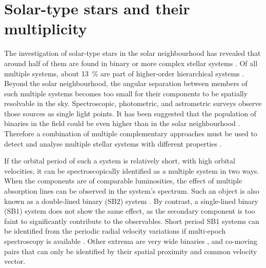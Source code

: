 \section{Solar-type stars and their multiplicity}
\label{sec:multiplicity_intro_twins}
The investigation of solar-type stars in the solar neighbourhood has revealed that around half of them are found in binary or more complex stellar systems \cite{2010ApJS..190....1R, 2013ARA&A..51..269D, 2017ApJS..230...15M}. Of all multiple systems, about 13~\% are part of higher-order hierarchical systems \cite{2010ApJS..190....1R, 2014AJ....147...87T}. Beyond the solar neighbourhood, the angular separation between members of such multiple systems becomes too small for their components to be spatially resolvable in the sky. Spectroscopic, photometric, and astrometric surveys observe those sources as single light points. It has been suggested that the population of binaries in the field could be even higher than in the solar neighbourhood \cite{2000A&A...361..770Q}. Therefore a combination of multiple complementary approaches must be used to detect and analyse multiple stellar systems with different properties \cite{2017ApJS..230...15M}.

If the orbital period of such a system is relatively short, with high orbital velocities, it can be spectroscopically identified as a multiple system in two ways. When the components are of comparable luminosities, the effect of multiple absorption lines can be observed in the system's spectrum. Such an object is also known as a double-lined binary (SB2) system \cite{2004A&A...424..727P, 2010AJ....140..184M, 2017PASP..129h4201F, 2017A&A...608A..95M}. By contrast, a single-lined binary (SB1) system does not show the same effect, as the secondary component is too faint to significantly contribute to the observables. Short period SB1 systems can be identified from the periodic radial velocity variations if multi-epoch spectroscopy is available \cite{1991A&A...248..485D, 2004A&A...418..989N, 2011AJ....141..200M, 2016AJ....151...85T, 2018ApJ...854..147B}. Other extrema are very wide binaries \cite{1988ApJ...335L..47G, 1990AJ....100.1968C, 1995ApJ...441..200G, 2009ApJ...703.1511K, 2011ApJS..192....2S, 2017MNRAS.472..675A, 2018MNRAS.480.4302C}, and co-moving pairs \cite{2017AJ....153..257O, 2019AJ....157...78J} that can only be identified by their spatial proximity and common velocity vector.


